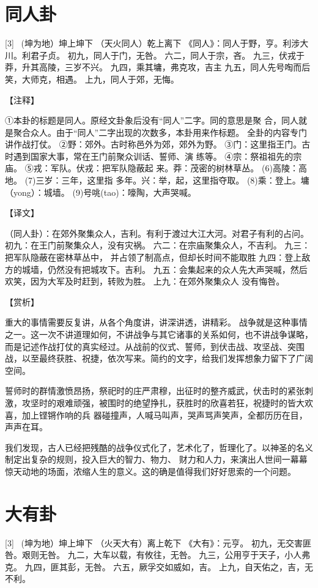 \documentclass[12pt,UTF8]{ctexbook}
\begin{document}
\chapter{同人卦}
[3] \ (坤为地）坤上坤下
（天火同人）乾上离下
《同人》：同人于野，亨。利涉大川。利君子贞。
初九，同人于门，无咎。
六二，同人于宗，吝。
九三，伏戎于莽，升其高陵，三岁不兴。
九四，乘其墉，弗克攻，吉主
九五，同人先号啕而后笑，大师克，相遇。
上九，同人于郊，无悔。

【注释】

①本卦的标题是同人。原经文卦象后没有“同人”二字。同的意思是聚 合，同人就是聚合众人。由于“同人”二字出现的次数多，本卦用来作标题。 全卦的内容专门讲作战打仗。
②野：郊外。古时称邑外为郊，郊外为野。
③门：这里指王门。古时遇到国家大事，常在王门前聚众训话、誓师、演 练等。
④宗：祭祖祖先的宗庙。
⑤戎：军队。伏戎：把军队隐蔽起 来。莽：茂密的树林草丛。
(6)高陵：高地。
(7)三岁：三年，这里指 多年。兴：举，起，这里指夺取。
(8)乘：登上。墉（yong）：城墙。
(9)号咷(tao)：嚎陶，大声哭喊。

【译文】

（同人卦）：在郊外聚集众人，吉利。有利于渡过大江大河。对君子有利的占问。
初九：在王门前聚集众人，没有灾祸。
六二：在宗庙聚集众人，不吉利。
九三：把军队隐蔽在密林草丛中， 并占领了制高点，但却长时间不能取胜
九四：登上敌方的城墙，仍然没有把城攻下。吉利。
九五：会集起来的众人先大声哭喊，然后欢笑，因为大军及时赶到，转败为胜。
上九：在郊外聚集众人 没有悔咎。

【赏析】

重大的事情需要反复讲，从各个角度讲，讲深讲透，讲精彩。 战争就是这种事情之一。这一次不讲道理如何，不讲战争与其它诸事的关系如何，也不讲战争谋略，而是记述作战打仗的真实经过。从战前的仪式、誓师，到伏击战、攻坚战、突围战，以至最终获胜、祝捷，依次写来。简约的文字，给我们发挥想象力留下了广阔空间。

誓师时的群情激愤昂扬，祭祀时的庄严肃穆，出征时的整齐威武，伏击时的紧张刺激，攻坚时的艰难顽强，被围时的绝望挣扎，获胜时的欣喜若狂，祝捷时的皆大欢喜，加上铿锵作响的兵 器碰撞声，人喊马叫声，哭声骂声笑声，全都历历在目，声声在耳。

我们发现，古人已经把残酷的战争仪式化了，艺术化了，哲理化了。以神圣的名义制定出复杂的规则，投入巨大的智力、物力、 财力和人力，来演出人世间一幕幕惊天动地的场面，浓缩人生的意义。这的确是值得我们好好思索的一个问题。

\chapter{大有卦}
[3] \ (坤为地）坤上坤下
（火天大有）离上乾下
《大有》：元亨。
初九，无交害匪咎。艰则无咎。
九二，大车以载，有攸往，无咎。
九三，公用亨于天子，小人弗克。
九四，匪其彭，无咎。
六五，厥孚交如威如，吉。
上九，自天佑之，吉，无不利。
\end{document}
